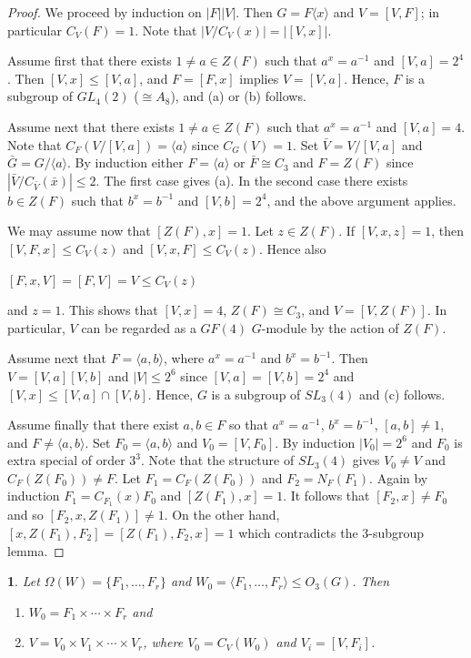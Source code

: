 \documentclass[11pt]{article}
\theoremstyle{plain}
\theoremstyle{stmplain}
\newtheorem{stm}{}[section]
\newcommand{\disp}[1]{\begin{center}$\displaystyle #1$\end{center}}
\begin{document}
\begin{proof}
We proceed by induction on $|F||V|$. Then $G = F\langle x \rangle$ and $V =
[V, F]$; in particular $C_V(F) = 1$. Note that $|V/C_V(x)| = |[V, x]|$.

\smallskip
\noindent Assume first that there exists $1 \ne a \in Z(F)$ such that $a^x = a^{-1}$
and $[V, a] = 2^4$. Then $[V, x] \le [V, a]$, and $F = [F, x]$ implies $V =
[V, a]$. Hence, $F$ is a subgroup of $GL_4(2)$ ($\cong A_8$), and (a) or (b)
follows.

\noindent Assume next that there exists $1 \ne a \in Z(F)$ such that $a^x = a^{-1}$
and $[V, a] = 4$. Note that $C_F(V/[V, a]) = \langle a \rangle$ since $C_G(V) =
1$. Set $\bar{V} = V/[V, a]$ and $\bar{G} = G/\langle a \rangle$. By induction
either $F = \langle a \rangle$ or $\bar{F} \cong C_3$ and $F = Z(F)$ since
$|\bar{V}/C_{\bar{V}}(\bar{x})| \le 2$. The first case gives (a). In the second
case there exists $b \in Z(F)$ such that $b^x = b^{-1}$ and $[V, b] = 2^4$, and
the above argument applies.

\smallskip
\noindent We may assume now that $[Z(F), x] = 1$. Let $z \in Z(F)$. If $[V, x, z] =
1$, then $[V, F, x] \le C_V(z)$ and $[V, x, F] \le C_V(z)$. Hence also
\disp{[F, x, V] = [F, V] = V \le C_V(z)}
and $z = 1$. This shows that $[V, x] = 4$, $Z(F) \cong C_3$, and $V = [V,
Z(F)]$. In particular, $V$ can be regarded as a $GF(4)$ $G$-module by the
action of $Z(F)$.

\smallskip
\noindent Assume next that $F = \langle a, b \rangle$, where $a^x = a^{-1}$ and $b^x
= b^{-1}$. Then $V = [V, a][V, b]$ and $|V| \le 2^6$ since $[V, a] = [V, b] =
2^4$ and $[V, x] \le [V, a] \cap [V, b]$. Hence, $G$ is a subgroup of $SL_3(4)$
and (c) follows.

\smallskip
\noindent Assume finally that there exist $a, b \in F$ so that $a^x = a^{-1}$, $b^x
= b^{-1}$, $[a, b] \ne 1$, and $F \ne \langle a, b \rangle$. Set $F_0 =
\langle a, b \rangle$ and $V_0 = [V, F_0]$. By induction $|V_0| = 2^6$ and
$F_0$ is extra special of order $3^3$. Note that the structure of $SL_3(4)$
gives $V_0 \ne V$ and $C_F(Z(F_0)) \ne F$. Let $F_1 = C_F(Z(F_0))$ and $F_2 =
N_F(F_1)$. Again by induction $F_1 = C_{F_1}(x)F_0$ and $[Z(F_1), x] = 1$. It
follows that $[F_2, x] \ne F_0$ and so $[F_2, x, Z(F_1)] \ne 1$. On the other
hand, $[x, Z(F_1), F_2] = [Z(F_1), F_2, x] = 1$ which contradicts the
3-subgroup lemma.
\end{proof}

\begin{stm}\label{st:1.4}
Let $\Omega(W) = \{F_1, \ldots, F_r\}$ and $W_0 = \langle F_1, \ldots, F_r \rangle
\le O_3(G)$. Then
\begin{enumerate}
\item[(a)] $W_0 = F_1 \times \cdots \times F_r$ and
\item[(b)] $V = V_0 \times V_1 \times \cdots \times V_r$, where $V_0 = C_V(W_0)$
  and $V_i = [V, F_i]$.
\end{enumerate}
\end{stm}
\end{document}
